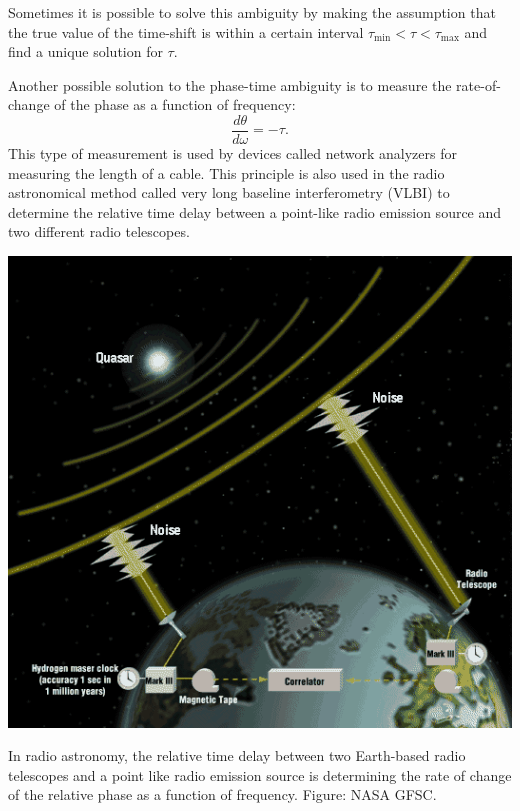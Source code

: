 Sometimes it is possible to solve this ambiguity by making the assumption that the true value of the time-shift is within a certain interval $\tau_{\mathrm{min}} < \tau < \tau_{\mathrm{max}}$ and find a unique solution for $\tau$.

Another possible solution to the phase-time ambiguity is to measure the rate-of-change of the phase as a function of frequency:
\begin{equation}
\frac{d\theta}{d\omega} = -\tau.
\end{equation}
This type of measurement is used by devices called network analyzers for measuring the length of a cable. 
This principle is also used in the radio astronomical method called very long baseline interferometry (VLBI) to determine the relative time delay between a point-like radio emission source and two different radio telescopes.

\begin{marginfigure}
\begin{center}
\includegraphics[width=\textwidth]{ch06/figures/vlbi.png}
\end{center}
\caption{In radio astronomy, the relative time delay between two Earth-based radio telescopes and a point like radio emission source is determining the rate of change of the relative phase as a function of frequency. Figure: NASA GFSC.}
\label{fig:vlbi_concept}
\end{marginfigure}

